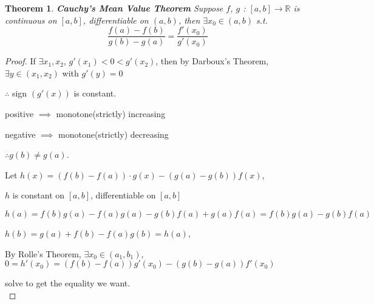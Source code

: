\documentclass[12pt]{article}
\theoremstyle{plain}
\newtheorem{theorem}{Theorem}[subsection]
\begin{document}
	\begin{theorem}{\textbf{Cauchy's Mean Value Theorem}}
		Suppose $f$, $g$ : $[a,b] \to\mathbb{R}$ is continuous on $[a,b]$, 
		differentiable on $(a,b)$,
		then $\exists x_0\in(a,b)$ s.t. 
		\[\frac{f(a)-f(b)}{g(b)-g(a)} = \frac{f'(x_0)}{g'(x_0)}\]
	\end{theorem}
	\begin{proof}
		If $\exists x_1, x_2$, $g'(x_1) < 0 < g'(x_2)$, then by Darboux's Theorem,
		$\exists y \in (x_1,x_2)$ with $g'(y)=0$

		$\therefore$ sign $(g'(x))$ is constant.
		\begin{description}
			\item positive $\implies$ monotone(strictly) increasing
			\item negative $\implies$ monotone(strictly) decreasing 
		\end{description}

		$\therefore g(b)\neq g(a)$. 

		Let $h(x) = (f(b)-f(a))\cdot g(x) - (g(a)-g(b))f(x)$,

		$h$ is constant on $[a,b]$, differentiable on $[a,b]$
		
		$h(a) = f(b)g(a)-f(a)g(a)-g(b)f(a)+g(a)f(a) = f(b)g(a)-g(b)f(a)$

		$h(b) = g(a)+f(b)-f(a)g(b) = h(a)$,

		By Rolle's Theorem, $\exists x_0 \in (a_1, b_1)$,
		$0 =h'(x_0) = (f(b)-f(a))g'(x_0) - (g(b)-g(a))f'(x_0)$

		solve to get the equality we want. \\
	\end{proof}
\end{document}
